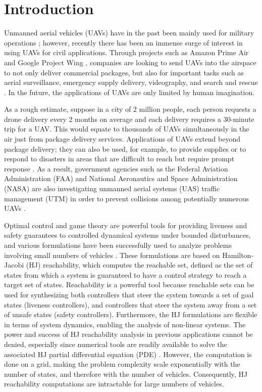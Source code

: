 \section{Introduction}
Unmanned aerial vehicles (UAVs) have in the past been mainly used for military operations \cite{Tice91}; however, recently there has been an immense surge of interest in using UAVs for civil applications. Through projects such as Amazon Prime Air \cite{PrimeAir} and Google Project Wing \cite{ProjectWing}, companies are looking to send UAVs into the airspace to not only deliver commercial packages, but also for important tasks such as aerial surveillance, emergency supply delivery, videography, and search and rescue \cite{Kopardekar16}. In the future, the applications of UAVs are only limited by human imagination. 

As a rough estimate, suppose in a city of 2 million people, each person requests a drone delivery every 2 months on average and each delivery requires a 30-minute trip for a UAV. This would equate to thousands of UAVs simultaneously in the air just from package delivery services. Applications of UAVs extend beyond package delivery; they can also be used, for example, to provide supplies or to respond to disasters in areas that are difficult to reach but require prompt response \cite{Debusk10,Tornado16}. As a result, government agencies such as the Federal Aviation Administration (FAA) and National Aeronautics and Space Administration (NASA) are also investigating unmanned aerial systems (UAS) traffic management (UTM) in order to prevent collisions among potentially numerous UAVs \cite{Kopardekar16, FAA13, NASA16}. 

Optimal control and game theory are powerful tools for providing liveness and safety guarantees to controlled dynamical systems under bounded disturbances, and various formulations \cite{Bokanowski10,Mitchell05,Barron89} have been successfully used to analyze problems involving small numbers of vehicles \cite{Fisac15,Chen14,Ding08}. These formulations are based on Hamilton-Jacobi (HJ) reachability, which computes the reachable set, defined as the set of states from which a system is guaranteed to have a control strategy to reach a target set of states. Reachability is a powerful tool because reachable sets can be used for synthesizing both controllers that steer the system towards a set of goal states (liveness controllers), and controllers that steer the system away from a set of unsafe states (safety controllers). Furthermore, the HJ formulations are flexible in terms of system dynamics, enabling the analysis of non-linear systems. The power and success of HJ reachability analysis in previous applications cannot be denied, especially since numerical tools are readily available to solve the associated HJ partial differential equation (PDE) \cite{LSToolbox,Osher02,Sethian96}. However, the computation is done on a grid, making the problem complexity scale exponentially with the number of states, and therefore with the number of vehicles. Consequently, HJ reachability computations are intractable for large numbers of vehicles. 

